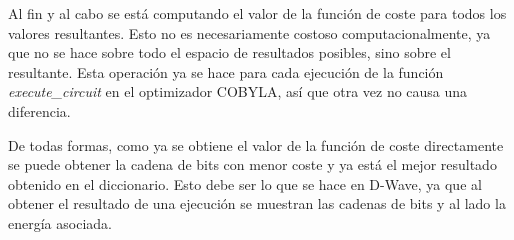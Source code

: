 \documentclass{article}
\begin{document}
Al fin y al cabo se está computando el valor de la función de coste para todos los valores resultantes. Esto no es necesariamente costoso computacionalmente, ya que no se hace sobre todo el espacio de resultados posibles, sino sobre el resultante. Esta operación ya se hace para cada ejecución de la función \textit{execute\_circuit} en el optimizador COBYLA, así que otra vez no causa una diferencia.

De todas formas, como ya se obtiene el valor de la función de coste directamente se puede obtener la cadena de bits con menor coste y ya está el mejor resultado obtenido en el diccionario. Esto debe ser lo que se hace en D-Wave, ya que al obtener el resultado de una ejecución se muestran las cadenas de bits y al lado la energía asociada.
\end{document}
